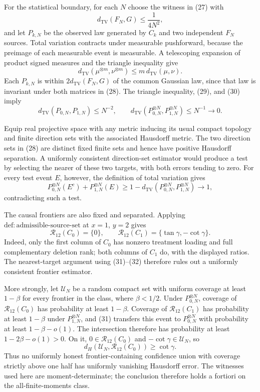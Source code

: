 For the statistical boundary, for each \(N\) choose the witness in (27) with
\[
 d_{\mathrm{TV}}(F_N,G)\le\frac{1}{4N^2}, \tag{29}
\]
and let \(P_{k,N}\) be the observed law generated by \(C_k\) and two independent \(F_N\) sources. Total variation contracts under measurable pushforward, because the preimage of each measurable event is measurable. A telescoping expansion of product signed measures and the triangle inequality give
\[
 d_{\mathrm{TV}}(\mu^{\otimes m},\nu^{\otimes m})
 \le m\,d_{\mathrm{TV}}(\mu,\nu). \tag{30}
\]
Each \(P_{k,N}\) is within \(2d_{\mathrm{TV}}(F_N,G)\) of the common Gaussian law, since that law is invariant under both matrices in (28). The triangle inequality, (29), and (30) imply
\[
 d_{\mathrm{TV}}(P_{0,N},P_{1,N})\le N^{-2},
 \qquad
 d_{\mathrm{TV}}(P_{0,N}^{\otimes N},P_{1,N}^{\otimes N})\le N^{-1}\longrightarrow0. \tag{31}
\]

Equip real projective space with any metric inducing its usual compact topology and finite direction sets with the associated Hausdorff metric. The two direction sets in (28) are distinct fixed finite sets and hence have positive Hausdorff separation. A uniformly consistent direction-set estimator would produce a test by selecting the nearer of these two targets, with both errors tending to zero. For every test event \(E\), however, the definition of total variation gives
\[
 P_{0,N}^{\otimes N}(E^c)+P_{1,N}^{\otimes N}(E)
 \ge1-d_{\mathrm{TV}}(P_{0,N}^{\otimes N},P_{1,N}^{\otimes N})\longrightarrow1, \tag{32}
\]
contradicting such a test.

The causal frontiers are also fixed and separated. Applying \(\mathrm{def:admissible\text{-}source\text{-}set}\) at \(x=1\), \(y=2\) gives
\[
 \mathcal R_{12}(C_0)=\{0\},
 \qquad
 \mathcal R_{12}(C_1)=\{\tan\gamma,-\cot\gamma\}. \tag{33}
\]
Indeed, only the first column of \(C_0\) has nonzero treatment loading and full complementary deletion rank; both columns of \(C_1\) do, with the displayed ratios. The nearest-target argument using (31)--(32) therefore rules out a uniformly consistent frontier estimator.

More strongly, let \(\mathcal U_N\) be a random compact set with uniform coverage at least \(1-\beta\) for every frontier in the class, where \(\beta<1/2\). Under \(P_{0,N}^{\otimes N}\), coverage of \(\mathcal R_{12}(C_0)\) has probability at least \(1-\beta\). Coverage of \(\mathcal R_{12}(C_1)\) has probability at least \(1-\beta\) under \(P_{1,N}^{\otimes N}\), and (31) transfers this event to \(P_{0,N}^{\otimes N}\) with probability at least \(1-\beta-o(1)\). The intersection therefore has probability at least \(1-2\beta-o(1)>0\). On it, \(0\in\mathcal R_{12}(C_0)\) and \(-\cot\gamma\in\mathcal U_N\), so
\[
 d_H(\mathcal U_N,\mathcal R_{12}(C_0))\ge\cot\gamma. \tag{34}
\]
Thus no uniformly honest frontier-containing confidence union with coverage strictly above one half has uniformly vanishing Hausdorff error. The witnesses used here are moment-determinate; the conclusion therefore holds a fortiori on the all-finite-moments class.

